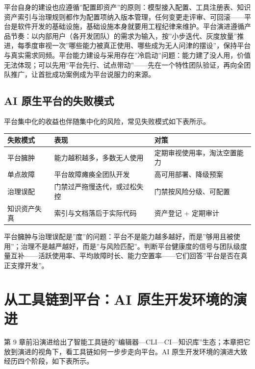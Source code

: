 \documentclass[
]{ctexbook}
\newcounter{none}
\begin{document}
平台自身的建设也应遵循''配置即资产''的原则：模型接入配置、工具注册表、知识资产索引与治理规则都作为配置项纳入版本管理，任何变更走评审、可回滚------平台是软件开发的基础设施，基础设施本身就要用工程纪律来维护。平台演进遵循产品节奏：以内部用户（各开发团队）的需求为输入，按''小步迭代、灰度放量''推进，每季度审视一次''哪些能力被真正使用、哪些成为无人问津的摆设''，保持平台与真实需求同频。平台能力建设与采用存在''冷启动''问题：能力建了没人用，价值无法体现；可以先用''平台先行、试点带动''------先在一个特性团队验证，再向全团队推广，让首批成功案例成为平台说服力的来源。

\subsection{AI
原生平台的失败模式}\label{ai-ux539fux751fux5e73ux53f0ux7684ux5931ux8d25ux6a21ux5f0f}

平台集中化的收益也伴随集中化的风险，常见失败模式如下表所示。

{\def\LTcaptype{none} %
\begin{longtable}[]{@{}lll@{}}
\toprule\noalign{}
失败模式 & 表现 & 对策 \\
\midrule\noalign{}
\endhead
\bottomrule\noalign{}
\endlastfoot
平台臃肿 & 能力越积越多，多数无人使用 & 定期审视使用率，淘汰空置能力 \\
单点故障 & 平台故障瘫痪全团队开发 & 高可用部署、降级预案 \\
治理误配 & 门禁过严拖慢迭代，或过松失控 & 门禁按风险分级、可配置 \\
知识资产失真 & 索引与文档落后于实际代码 & 资产登记 + 定期审计 \\
\end{longtable}
}

平台臃肿与治理误配是''度''的问题：平台不是能力越多越好，而是''够用且被使用''；治理不是越严越好，而是''与风险匹配''。判断平台健康度的信号与团队级度量互补------活跃使用率、平均故障时长、能力空置率------它们回答''平台是否在真正支撑开发''。

\section{从工具链到平台：AI
原生开发环境的演进}\label{ux4eceux5de5ux5177ux94feux5230ux5e73ux53f0ai-ux539fux751fux5f00ux53d1ux73afux5883ux7684ux6f14ux8fdb}

第 9
章前沿演进给出了智能工具链的''编辑器---CLI---CI---知识库''生态；本章把它放到演进的视角下，看工具链如何一步步走向平台。AI
原生开发环境的演进大致经历四个阶段，如下表所示。
\end{document}
